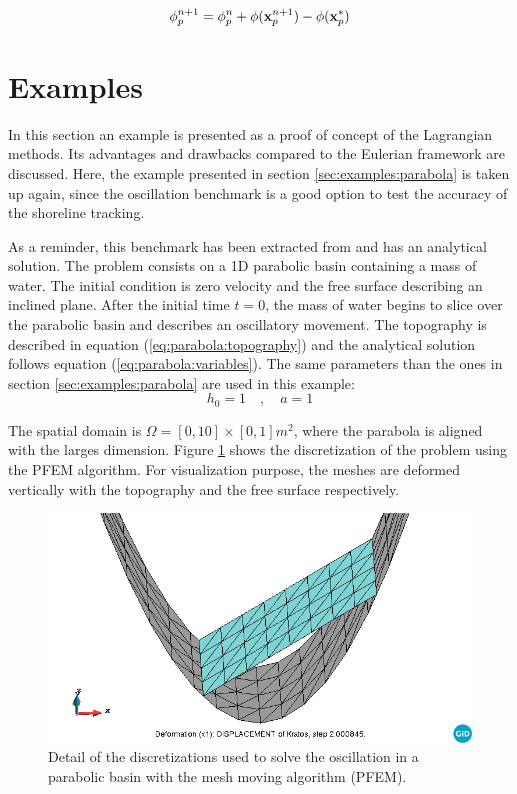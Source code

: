 \begin{equation}
    \phi_p^{n+1} = \phi_p^n + \phi({\bf x}_p^{n+1}) - \phi({\bf x}_p^*)
\end{equation}



\section{Examples}


In this section an example is presented as a proof of concept of the Lagrangian methods. Its advantages and drawbacks compared to the Eulerian framework are discussed. Here, the example presented in section \ref{sec:examples:parabola} is taken up again, since the oscillation benchmark is a good option to test the accuracy of the shoreline tracking.

As a reminder, this benchmark has been extracted from \cite{delestre2013} and has an analytical solution. The problem consists on a 1D parabolic basin containing a mass of water. The initial condition is zero velocity and the free surface describing an inclined plane. After the initial time $t=0$, the mass of water begins to slice over the parabolic basin and describes an oscillatory movement. The topography is described in equation (\ref{eq:parabola:topography}) and the analytical solution follows equation (\ref{eq:parabola:variables}). The same parameters than the ones in section \ref{sec:examples:parabola} are used in this example:
\begin{equation*}
    h_0 = 1 \quad,\quad a = 1
\end{equation*}

The spatial domain is $\Omega=[0,10]\times[0,1]m^2$, where the parabola is aligned with the larges dimension. 
Figure \ref{fig:pfem_parabola_view} shows the discretization of the problem using the PFEM algorithm. For visualization purpose, the meshes are deformed vertically with the topography and the free surface respectively.

\begin{figure}
    \centering
    \includegraphics[width=.8\textwidth]{img/lagrangian/parabola_view.png}
    \caption{Detail of the discretizations used to solve the oscillation in a parabolic basin with the mesh moving algorithm (PFEM).}
    \label{fig:pfem_parabola_view}
\end{figure}



